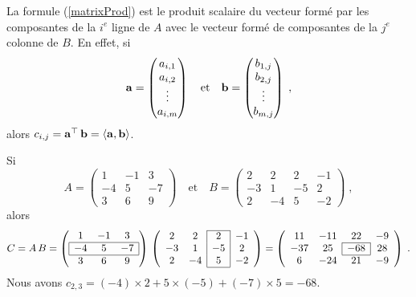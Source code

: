{La formule (\ref{matrixProd}) est le produit scalaire du vecteur formé
par les composantes de la $i^e$ ligne de $A$ avec le vecteur formé de
composantes de la $j^e$ colonne de $B$.  En effet, si
\[
\mathbf{a} = \begin{pmatrix} a_{i,1} \\ a_{i,2} \\ \vdots \\
a_{i,m} \end{pmatrix}
\quad \text{et} \quad
\mathbf{b} = \begin{pmatrix} b_{1,j} \\ b_{2,j} \\ \vdots \\
b_{m,j} \end{pmatrix} \; ,
\]
alors
$c_{i,j} = \mathbf{a}^\top\,\mathbf{b} = \left\langle{\mathbf{a}} , {\mathbf{b}}\right\rangle$.

\begin{egg}
Si
\[
A = \begin{pmatrix} 1 & -1 & 3 \\ -4 & 5 & -7 \\ 3 & 6 & 9
\end{pmatrix} \quad \text{et} \quad
B = \begin{pmatrix} 2 & 2 & 2 & -1 \\ -3 & 1 & -5 & 2 \\ 2 & -4 & 5 & -2
\end{pmatrix} \; ,
\]
alors
\[
C = A\,B =
\left(\begin{array}{ccc}
1 & -1 & 3 \\
\hline
\multicolumn{1}{|c}{-4} & 5 & \multicolumn{1}{c|}{-7} \\
\hline
3 & 6 & 9
\end{array}
\right) \,
\left(
\begin{array}{cccc}
\cline{3-3}
2 & 2 & \multicolumn{1}{|c|}{2} & -1 \\
-3 & 1 & \multicolumn{1}{|c|}{-5} & 2 \\
2 & -4 & \multicolumn{1}{|c|}{5} & -2 \\
\cline{3-3}
\end{array}
\right)
=
\left(
\begin{array}{cccc}
11 & -11 & 22 & -9 \\
\cline{3-3}
-37 & 25 & \multicolumn{1}{|c|}{-68} & 28 \\
\cline{3-3}
6 & -24 & 21 & -9
\end{array}
\right) \; .
\]
Nous avons $c_{2,3} = (-4) \times 2 + 5 \times (-5) + (-7)\times 5 = -68$.


\end{egg}}
